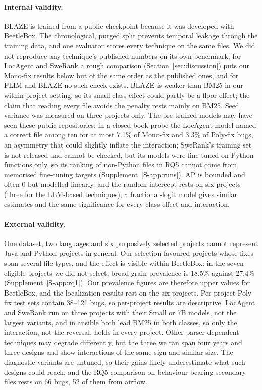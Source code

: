 \documentclass[a4paper,fleqn]{cas-dc}
\begin{document}
\paragraph{Internal validity.} BLAZE is trained from a public checkpoint
because it was developed with BeetleBox. The chronological, purged split
prevents temporal leakage through the training data, and one evaluator scores
every technique on the
same files. We did not reproduce any technique's published numbers on its own
benchmark; for LocAgent and SweRank a rough comparison
(Section~\ref{sec:discussion}) puts our Mono-fix results below but of the
same order as the published ones, and for FLIM and BLAZE no such check exists.
BLAZE is weaker than BM25 in our within-project setting, so its small class
effect could partly be a floor effect; the claim that reading every file
avoids the penalty rests mainly on BM25. Seed variance was measured on three
projects only. The pre-trained models may have seen these public repositories:
in a closed-book probe the LocAgent model named a correct file among ten for
at most 7.1\% of Mono-fix and 3.3\% of Poly-fix bugs, an asymmetry that could
slightly inflate the interaction; SweRank's training set is not released and
cannot be checked, but its models were fine-tuned on Python functions only, so
its ranking of non-Python files in RQ5 cannot come from memorised fine-tuning
targets (Supplement~\ref{S-app:runs}). AP is bounded and often 0 but modelled
linearly, and the random intercept rests on six projects (three for the
LLM-based techniques); a fractional-logit model gives similar estimates and the
same significance for every class effect and interaction.

\paragraph{External validity.} One dataset, two languages and six purposively
selected projects cannot represent Java and Python projects in general. Our
selection favoured projects whose fixes span several file types, and the
effect is visible within BeetleBox: in the seven eligible projects we did not
select, broad-grain prevalence is 18.5\% against 27.4\%
(Supplement~\ref{S-app:rq1}). Our prevalence figures are therefore upper values
for BeetleBox, and the localization results rest on the six projects.
Per-project Poly-fix test sets contain 38--121 bugs, so per-project results
are descriptive. LocAgent and SweRank run on three projects with their Small
or 7B models, not the largest variants, and in ansible both lead BM25 in both
classes, so only the interaction, not the reversal, holds in every project.
Other parser-dependent techniques may degrade differently, but the three we
ran span four years and three designs and show interactions of the same sign
and similar size. The
diagnostic variants are untuned, so their gains likely underestimate what such
designs could reach, and the RQ5 comparison on behaviour-bearing secondary
files rests on 66 bugs, 52 of them from airflow.
\end{document}
